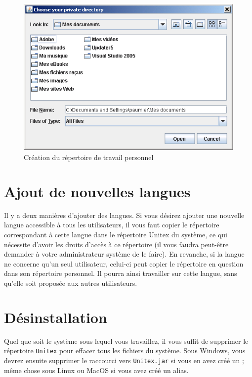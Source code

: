 \begin{figure}[h]
\begin{center}
\includegraphics[width=13cm]{resources/img/fig1-3.png}
\caption{Création du répertoire de travail personnel
\label{fig-creation-personal-directory}}
\end{center}
\end{figure}



\section{Ajout de nouvelles langues}

\bigskip
\noindent Il y a deux manières d’ajouter des langues. Si vous désirez ajouter une nouvelle langue
accessible à tous les utilisateurs, il vous faut copier le répertoire correspondant à cette langue
dans le répertoire Unitex du système, ce qui nécessite d’avoir les droits d’accès à ce répertoire
(il vous faudra peut-être demander à votre administrateur système de le faire).
En revanche, si la langue ne concerne qu’un seul utilisateur, celui-ci peut copier le répertoire
en question dans son répertoire personnel. Il pourra ainsi travailler sur cette langue, sans
qu’elle soit proposée aux autres utilisateurs.



\section{Désinstallation}
Quel que soit le système sous lequel vous travaillez, il vous suffit de supprimer le répertoire
\verb+Unitex+ pour effacer tous les fichiers du système. Sous Windows, vous devrez ensuite supprimer
le raccourci vers \verb+Unitex.jar+  si vous en avez créé un ;
même chose sous Linux ou MacOS si vous avez créé un alias.



